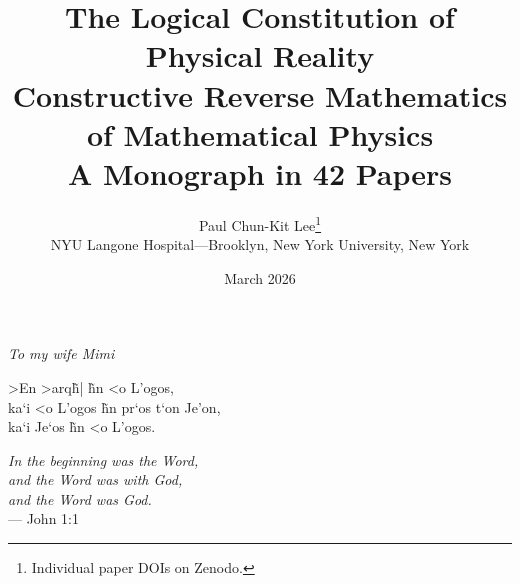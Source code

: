 \documentclass[11pt,a4paper]{report}
\title{%
  \textbf{The Logical Constitution of Physical Reality}\\[6pt]
  {\Large Constructive Reverse Mathematics of Mathematical Physics}\\[4pt]
  {\large A Monograph in 42 Papers}%
}
\author{%
  Paul Chun-Kit Lee\thanks{Individual paper DOIs on Zenodo.}\\
  NYU Langone Hospital---Brooklyn, New York University, New York
}
\date{March 2026}
\theoremstyle{plain}
\theoremstyle{definition}
\theoremstyle{remark}
\begin{document}

\maketitle

\clearpage
\thispagestyle{empty}
\vspace*{\fill}
\begin{center}
\textit{To my wife Mimi}
\end{center}
\vspace*{\fill}

\clearpage
\thispagestyle{empty}
\vspace*{\fill}
\begin{center}
{\large
\foreignlanguage{greek}{%
>En >arq\~h| \~hn <o L'ogos,\\[4pt]
ka`i <o L'ogos \~hn pr`os t`on Je'on,\\[4pt]
ka`i Je`os \~hn <o L'ogos.%
}}
\end{center}
\vspace{1cm}
\begin{center}
\normalsize\textit{In the beginning was the Word,\\
and the Word was with God,\\
and the Word was God.}\\[6pt]
--- John 1:1
\end{center}
\vspace*{\fill}
\end{document}
